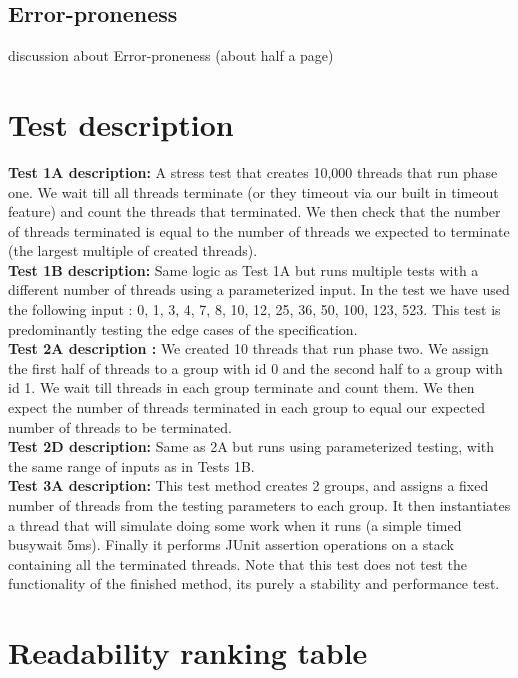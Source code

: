 \documentclass[11pt]{article}
\begin{document}
\pagebreak
\subsection{Error-proneness}
discussion about Error-proneness (about half a page)

\newpage
\appendix
\section{Test description}
\textbf{Test 1A description:} A stress test that creates 10,000 threads that run phase one. We wait till all threads terminate (or they timeout via our built in timeout feature) and count the threads that terminated. We then check that the number of threads terminated is equal to the number of threads we expected to terminate (the largest multiple of created threads).\\

\textbf{Test 1B description:} Same logic as Test 1A but runs multiple tests with a different number of threads using a parameterized input. In the test we have used the following input : {0, 1, 3, 4, 7, 8, 10, 12, 25, 36, 50, 100, 123, 523}. This test is predominantly testing the edge cases of the specification. \\

\textbf{Test 2A description :} We created 10 threads that run phase two. We assign the first half of threads to a group with id 0 and the second half to a group with id 1. We wait till threads in each group terminate and count them. We then expect the number of threads terminated in each group to equal our expected number of threads to be terminated. \\


\textbf{Test 2D description:} Same as 2A but runs using parameterized testing, with the same range of inputs as in Tests 1B.
\\

\textbf{Test 3A description:} This test method creates 2 groups, and assigns a fixed number of threads from the testing parameters to each group. It then instantiates a thread that will simulate doing some work when it runs (a simple timed busywait 5ms). Finally it performs JUnit assertion operations on a stack containing all the terminated threads. Note that this test does not test the functionality of the finished method, its purely a stability and performance test.
\\


\section{Readability ranking table}
\end{document}
